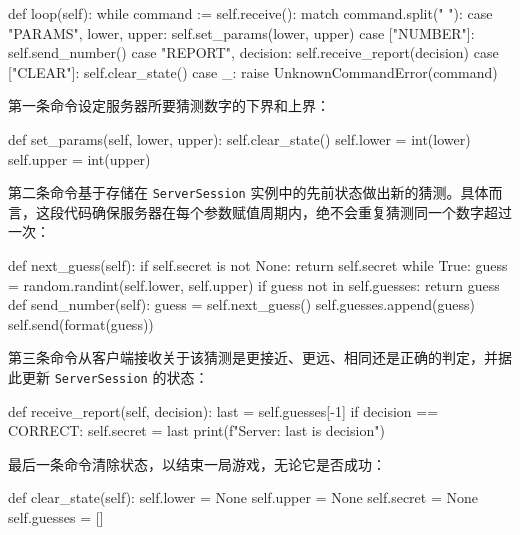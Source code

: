 \begin{codebox}[python]
    def loop(self):
        while command := self.receive():
            match command.split(" "):
                case "PARAMS", lower, upper:
                    self.set_params(lower, upper)
                case ["NUMBER"]:
                    self.send_number()
                case "REPORT", decision:
                    self.receive_report(decision)
                case ["CLEAR"]:
                    self.clear_state()
                case _:
                    raise UnknownCommandError(command)
\end{codebox}

第一条命令设定服务器所要猜测数字的下界和上界：

\begin{codebox}[python]
    def set_params(self, lower, upper):
        self.clear_state()
        self.lower = int(lower)
        self.upper = int(upper)
\end{codebox}

第二条命令基于存储在 \texttt{ServerSession} 实例中的先前状态做出新的猜测。具体而言，这段代码确保服务器在每个参数赋值周期内，绝不会重复猜测同一个数字超过一次：

\begin{codebox}[python]
    def next_guess(self):
        if self.secret is not None:
            return self.secret
        while True:
            guess = random.randint(self.lower, self.upper)
            if guess not in self.guesses:
                return guess
    def send_number(self):
        guess = self.next_guess()
        self.guesses.append(guess)
        self.send(format(guess))
\end{codebox}

第三条命令从客户端接收关于该猜测是更接近、更远、相同还是正确的判定，并据此更新 \texttt{ServerSession} 的状态：

\begin{codebox}[python]
    def receive_report(self, decision):
        last = self.guesses[-1]
        if decision == CORRECT:
            self.secret = last
        print(f"Server: {last} is {decision}")
\end{codebox}

最后一条命令清除状态，以结束一局游戏，无论它是否成功：

\begin{codebox}[python]
    def clear_state(self):
        self.lower = None
        self.upper = None
        self.secret = None
        self.guesses = []
\end{codebox}

